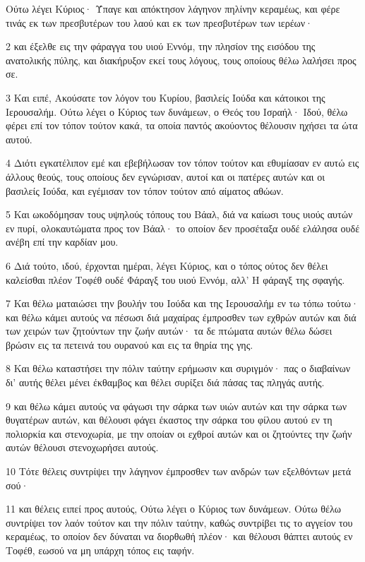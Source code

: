 \par Ούτω λέγει Κύριος· Ύπαγε και απόκτησον λάγηνον πηλίνην κεραμέως, και φέρε τινάς εκ των πρεσβυτέρων του λαού και εκ των πρεσβυτέρων των ιερέων·
\par 2 και έξελθε εις την φάραγγα του υιού Εννόμ, την πλησίον της εισόδου της ανατολικής πύλης, και διακήρυξον εκεί τους λόγους, τους οποίους θέλω λαλήσει προς σε.
\par 3 Και ειπέ, Ακούσατε τον λόγον του Κυρίου, βασιλείς Ιούδα και κάτοικοι της Ιερουσαλήμ. Ούτω λέγει ο Κύριος των δυνάμεων, ο Θεός του Ισραήλ· Ιδού, θέλω φέρει επί τον τόπον τούτον κακά, τα οποία παντός ακούοντος θέλουσιν ηχήσει τα ώτα αυτού.
\par 4 Διότι εγκατέλιπον εμέ και εβεβήλωσαν τον τόπον τούτον και εθυμίασαν εν αυτώ εις άλλους θεούς, τους οποίους δεν εγνώρισαν, αυτοί και οι πατέρες αυτών και οι βασιλείς Ιούδα, και εγέμισαν τον τόπον τούτον από αίματος αθώων.
\par 5 Και ωκοδόμησαν τους υψηλούς τόπους του Βάαλ, διά να καίωσι τους υιούς αυτών εν πυρί, ολοκαυτώματα προς τον Βάαλ· το οποίον δεν προσέταξα ουδέ ελάλησα ουδέ ανέβη επί την καρδίαν μου.
\par 6 Διά τούτο, ιδού, έρχονται ημέραι, λέγει Κύριος, και ο τόπος ούτος δεν θέλει καλείσθαι πλέον Τοφέθ ουδέ Φάραγξ του υιού Εννόμ, αλλ' Η φάραγξ της σφαγής.
\par 7 Και θέλω ματαιώσει την βουλήν του Ιούδα και της Ιερουσαλήμ εν τω τόπω τούτω· και θέλω κάμει αυτούς να πέσωσι διά μαχαίρας έμπροσθεν των εχθρών αυτών και διά των χειρών των ζητούντων την ζωήν αυτών· τα δε πτώματα αυτών θέλω δώσει βρώσιν εις τα πετεινά του ουρανού και εις τα θηρία της γης.
\par 8 Και θέλω καταστήσει την πόλιν ταύτην ερήμωσιν και συριγμόν· πας ο διαβαίνων δι' αυτής θέλει μένει έκθαμβος και θέλει συρίξει διά πάσας τας πληγάς αυτής.
\par 9 και θέλω κάμει αυτούς να φάγωσι την σάρκα των υιών αυτών και την σάρκα των θυγατέρων αυτών, και θέλουσι φάγει έκαστος την σάρκα του φίλου αυτού εν τη πολιορκία και στενοχωρία, με την οποίαν οι εχθροί αυτών και οι ζητούντες την ζωήν αυτών θέλουσι στενοχωρήσει αυτούς.
\par 10 Τότε θέλεις συντρίψει την λάγηνον έμπροσθεν των ανδρών των εξελθόντων μετά σού·
\par 11 και θέλεις ειπεί προς αυτούς, Ούτω λέγει ο Κύριος των δυνάμεων. Ούτω θέλω συντρίψει τον λαόν τούτον και την πόλιν ταύτην, καθώς συντρίβει τις το αγγείον του κεραμέως, το οποίον δεν δύναται να διορθωθή πλέον· και θέλουσι θάπτει αυτούς εν Τοφέθ, εωσού να μη υπάρχη τόπος εις ταφήν.
